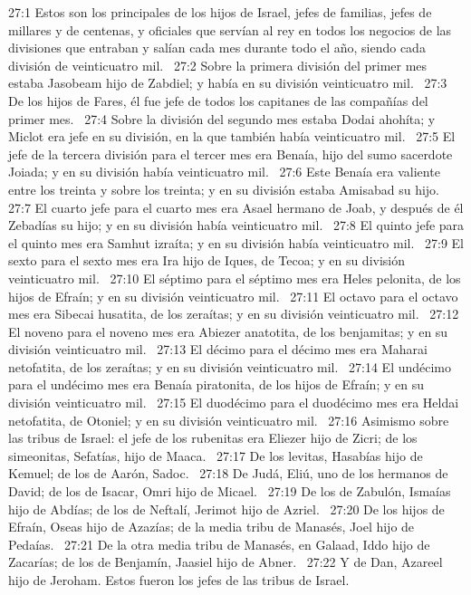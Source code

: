 27:1 Estos son los principales de los hijos de Israel, jefes de familias, jefes de millares y de centenas, y oficiales que servían al rey en todos los negocios de las divisiones que entraban y salían cada mes durante todo el año, siendo cada división de veinticuatro mil.  
27:2 Sobre la primera división del primer mes estaba Jasobeam hijo de Zabdiel; y había en su división veinticuatro mil.  
27:3 De los hijos de Fares, él fue jefe de todos los capitanes de las compañías del primer mes.  
27:4 Sobre la división del segundo mes estaba Dodai ahohíta; y Miclot era jefe en su división, en la que también había veinticuatro mil.  
27:5 El jefe de la tercera división para el tercer mes era Benaía, hijo del sumo sacerdote Joiada; y en su división había veinticuatro mil.  
27:6 Este Benaía era valiente entre los treinta y sobre los treinta; y en su división estaba Amisabad su hijo.  
27:7 El cuarto jefe para el cuarto mes era Asael hermano de Joab, y después de él Zebadías su hijo; y en su división había veinticuatro mil.  
27:8 El quinto jefe para el quinto mes era Samhut izraíta; y en su división había veinticuatro mil.  
27:9 El sexto para el sexto mes era Ira hijo de Iques, de Tecoa; y en su división veinticuatro mil.  
27:10 El séptimo para el séptimo mes era Heles pelonita, de los hijos de Efraín; y en su división veinticuatro mil.  
27:11 El octavo para el octavo mes era Sibecai husatita, de los zeraítas; y en su división veinticuatro mil.  
27:12 El noveno para el noveno mes era Abiezer anatotita, de los benjamitas; y en su división veinticuatro mil.  
27:13 El décimo para el décimo mes era Maharai netofatita, de los zeraítas; y en su división veinticuatro mil.  
27:14 El undécimo para el undécimo mes era Benaía piratonita, de los hijos de Efraín; y en su división veinticuatro mil.  
27:15 El duodécimo para el duodécimo mes era Heldai netofatita, de Otoniel; y en su división veinticuatro mil.  
27:16 Asimismo sobre las tribus de Israel: el jefe de los rubenitas era Eliezer hijo de Zicri; de los simeonitas, Sefatías, hijo de Maaca.  
27:17 De los levitas, Hasabías hijo de Kemuel; de los de Aarón, Sadoc.  
27:18 De Judá, Eliú, uno de los hermanos de David; de los de Isacar, Omri hijo de Micael.  
27:19 De los de Zabulón, Ismaías hijo de Abdías; de los de Neftalí, Jerimot hijo de Azriel.  
27:20 De los hijos de Efraín, Oseas hijo de Azazías; de la media tribu de Manasés, Joel hijo de Pedaías.  
27:21 De la otra media tribu de Manasés, en Galaad, Iddo hijo de Zacarías; de los de Benjamín, Jaasiel hijo de Abner.  
27:22 Y de Dan, Azareel hijo de Jeroham. Estos fueron los jefes de las tribus de Israel.  
